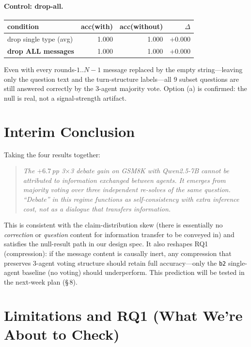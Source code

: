 \begin{itemize}
\paragraph{Control: drop-all.}
\begin{center}
\begin{tabular}{lrrr}
\toprule
condition & acc(with) & acc(without) & $\Delta$ \\
\midrule
drop single type (avg) & 1.000 & 1.000 & $+0.000$ \\
\textbf{drop ALL messages}      & 1.000 & 1.000 & $\mathbf{+0.000}$ \\
\bottomrule
\end{tabular}
\end{center}
Even with every rounds-$1..N{-}1$ message replaced by the empty string---leaving only the question text and the turn-structure labels---all 9 subset questions are still answered correctly by the 3-agent majority vote. Option (a) is confirmed: the null is real, not a signal-strength artifact.

\section*{Interim Conclusion}

Taking the four results together:

\begin{quote}
\itshape
The $+6.7$\,pp 3$\times$3 debate gain on GSM8K with Qwen2.5-7B cannot be attributed to information exchanged between agents. It emerges from majority voting over three independent re-solves of the same question. ``Debate'' in this regime functions as self-consistency \cite{wang2023selfconsistencyimproveschainthought} with extra inference cost, not as a dialogue that transfers information.
\end{quote}

This is consistent with the claim-distribution skew (there is essentially no \textit{correction} or \textit{question} content for information transfer to be conveyed in) and satisfies the null-result path in our design spec. It also reshapes RQ1 (compression): if the message content is causally inert, any compression that preserves 3-agent voting structure should retain full accuracy---only the \texttt{b2} single-agent baseline (no voting) should underperform. This prediction will be tested in the next-week plan (\S\,8).

\section*{Limitations and RQ1 (What We're About to Check)}


\end{itemize}
